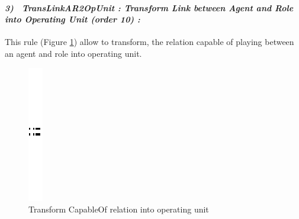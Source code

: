 \paragraph{\emph{3)~ TransLinkAR2OpUnit : Transform Link between Agent and Role into Operating Unit (order 10) :} } This rule (Figure \ref{fig:Operating Unit for every link capable of playing}) allow to transform, the relation capable of playing between an agent and role  into operating unit.
\vspace{1cm}
\begin{figure}[th]
	\centering
	\quad{}
		\includegraphics{ch3/img/sep}
	\quad{}
\caption{\label{fig:Operating Unit for every link capable of playing}Transform CapableOf relation into operating unit} 
\end{figure}



